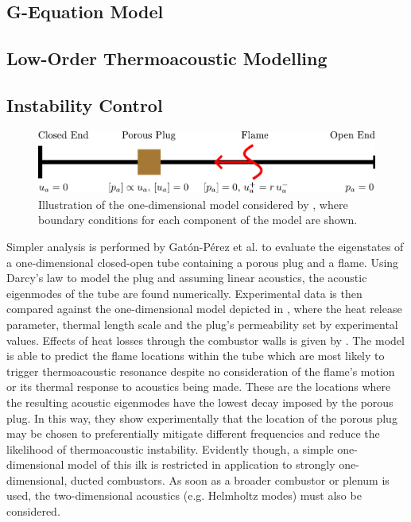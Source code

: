 \subsection{G-Equation Model}





\subsection{Low-Order Thermoacoustic Modelling}


\cite{juniper2018SensitivityNonlinearityThermoacoustic}




\subsection{Instability Control}

\begin{figure}[t]
\centering
\includegraphics[scale=0.65]{assets/imgs/GP-model.pdf}
\caption{Illustration of the one-dimensional model considered by \cite{gaton-perez2025MitigationThermoacousticInstabilities}, where boundary conditions for each component of the model are shown.}
\label{fig:GP-model}
\end{figure}

Simpler analysis is performed by Gatón-Pérez et al. \cite{gaton-perez2025MitigationThermoacousticInstabilities} to evaluate the eigenstates of a one-dimensional closed-open tube containing a porous plug and a flame. Using Darcy's law to model the plug and assuming linear acoustics, the acoustic eigenmodes of the tube are found numerically. Experimental data is then compared against the one-dimensional model depicted in , where the heat release parameter, thermal length scale and the plug's permeability set by experimental values. Effects of heat losses through the combustor walls is given by \cite{flores-montoya2022NonadiabaticModulationPremixedflame}. The model is able to predict the flame locations within the tube which are most likely to trigger thermoacoustic resonance despite no consideration of the flame's motion or its thermal response to acoustics being made. These are the locations where the resulting acoustic eigenmodes have the lowest decay imposed by the porous plug. In this way, they show experimentally that the location of the porous plug may be chosen to preferentially mitigate different frequencies and reduce the likelihood of thermoacoustic instability. Evidently though, a simple one-dimensional model of this ilk is restricted in application to strongly one-dimensional, ducted combustors. As soon as a broader combustor or plenum is used, the two-dimensional acoustics (e.g. Helmholtz modes) must also be considered.

